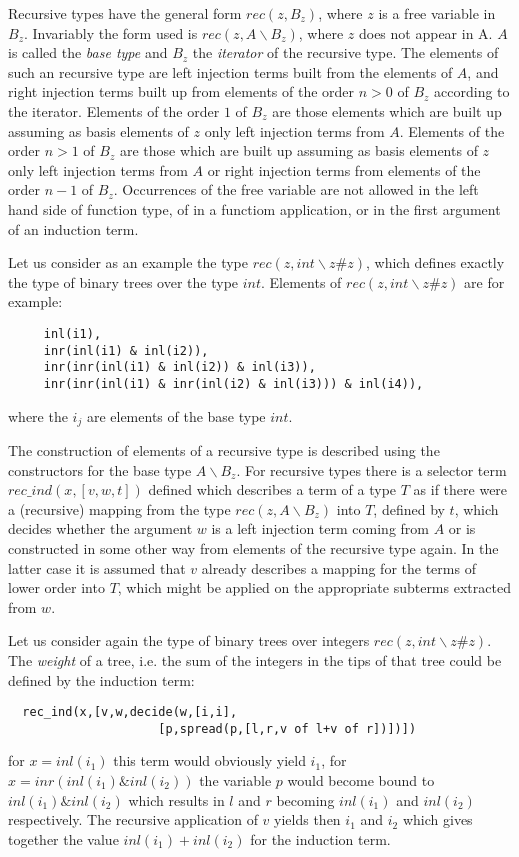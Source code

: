 \documentclass[11pt]{report}
\begin{document}
 Recursive types have the general form $rec(z,B_z)$, where $z$
 is a free variable in $B_z$.
 Invariably the form used is $rec(z,A\backslash B_z)$,  where $z$ 
 does not appear in A.
 $A$ is called the \emph{base type} and $B_z$ the \emph{iterator}
 of the recursive type. 
 The elements of such an recursive type are left injection terms
 built from the elements of $A$, and right injection terms built
 up from elements of the order $n$$>$$0$ of $B_z$ according to the
 iterator. Elements of the order $1$ of $B_z$ are those elements which
 are built up assuming as basis elements of $z$ only left injection
 terms from $A$. Elements of the order $n$$>$$1$ of $B_z$ are those  
 which are built up assuming as basis elements of $z$ only left
 injection terms from $A$ or right injection terms from elements
 of the order $n-1$ of $B_z$. Occurrences of the free variable
 are not allowed in the left hand side of function type, of
 in a functiom application, or in the first argument of an induction term.
 
 Let us consider as an example the type $rec(z,int\backslash z\#z)$, 
 which defines exactly the type of binary trees over the type $int$.
 Elements of  $rec(z,int\backslash z\#z)$ are for example:
 \begin{verbatim}
     inl(i1),
     inr(inl(i1) & inl(i2)),
     inr(inr(inl(i1) & inl(i2)) & inl(i3)),
     inr(inr(inl(i1) & inr(inl(i2) & inl(i3))) & inl(i4)), \end{verbatim}
 where the $i_j$ are elements of the base type $int$.
 
 The construction of elements of a recursive type is described
 using the constructors for the base type $A\backslash B_z$.
 For recursive types there is a selector term $rec\_ind(x,[v,w,t])$ 
 defined which describes a term of a type $T$ as if there were 
 a (recursive) mapping from the type $rec(z,A\backslash B_z)$ into $T$,
 defined by $t$, which decides whether the argument $w$ is a left
 injection term coming from $A$ or is constructed in some other way
 from elements of the recursive type again. In the latter case
 it is assumed that $v$ already describes a mapping for the
 terms of lower order into $T$, which might be applied
 on the appropriate subterms extracted from $w$. 
 
 Let us consider again the type of binary trees over integers
 $rec(z,int\backslash z\#z)$. The \emph{weight} of a tree, i.e. the
 sum of the integers in the tips of that tree could be defined 
 by the induction term:
 \begin{verbatim}
  rec_ind(x,[v,w,decide(w,[i,i], 
                     [p,spread(p,[l,r,v of l+v of r])])]) \end{verbatim}
 for $x=inl(i_1)$ this term would obviously yield $i_1$, for
 $x=inr(inl(i_1)\&inl(i_2))$ the variable $p$ would become bound
 to $inl(i_1)\&inl(i_2)$ which results in $l$ and $r$ becoming
 $inl(i_1)$ and $inl(i_2)$ respectively. The recursive application
 of $v$ yields then $i_1$ and $i_2$ which gives together the value
 $inl(i_1)+inl(i_2)$ for the induction term.
 
\end{document}
